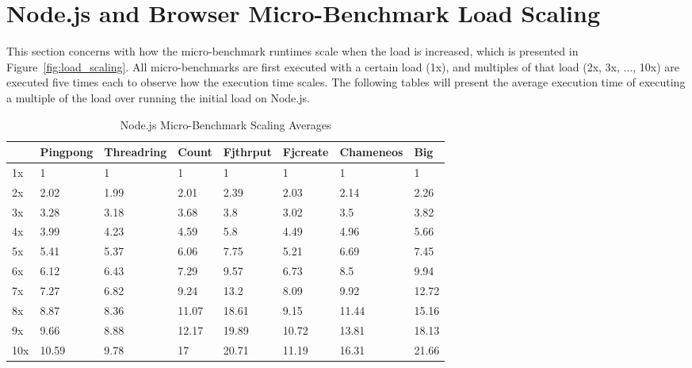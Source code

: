 \documentclass[oneside]{um-fict}
\begin{document}
\section{Node.js and Browser Micro-Benchmark Load Scaling}
This section concerns with how the micro-benchmark runtimes scale when the load is increased, which is presented in Figure~\ref{fig:load_scaling}. All micro-benchmarks are first executed with a certain load (1x), and multiples of that load (2x, 3x, $\ldots$, 10x) are executed five times each to observe how the execution time scales. The following tables will present the average execution time of executing a multiple of the load over running the initial load on Node.js.
\begin{table}[H]
    \begin{center}
        \begin{tabular}{|l|lllllll|}
        \hline
        & Pingpong & Threadring & Count & Fjthrput & Fjcreate & Chameneos  & Big   \\ \hline
        1x & 1        & 1          & 1     & 1        & 1        & 1     & 1     \\
        2x & 2.02     & 1.99       & 2.01  & 2.39     & 2.03     & 2.14  & 2.26  \\
        3x  & 3.28     & 3.18       & 3.68  & 3.8      & 3.02     & 3.5   & 3.82  \\
        4x & 3.99     & 4.23       & 4.59  & 5.8      & 4.49     & 4.96  & 5.66  \\
        5x  & 5.41     & 5.37       & 6.06  & 7.75     & 5.21     & 6.69  & 7.45  \\
        6x & 6.12     & 6.43       & 7.29  & 9.57     & 6.73     & 8.5   & 9.94  \\
        7x & 7.27     & 6.82       & 9.24  & 13.2     & 8.09     & 9.92  & 12.72 \\
        8x & 8.87     & 8.36       & 11.07 & 18.61    & 9.15     & 11.44 & 15.16 \\
        9x & 9.66     & 8.88       & 12.17 & 19.89    & 10.72    & 13.81 & 18.13 \\
        10x & 10.59    & 9.78       & 17    & 20.71    & 11.19    & 16.31 & 21.66 \\ \hline
        \end{tabular}
        \caption{Node.js Micro-Benchmark Scaling Averages}\label{tab:nodeloadscalingavg}
    \end{center}
\end{table}
\end{document}
